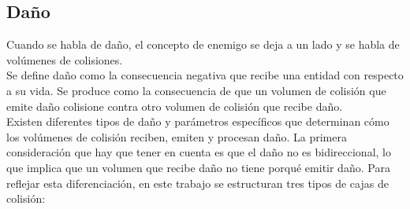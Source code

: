 \subsection{Daño}
Cuando se habla de daño, el concepto de enemigo se deja a un lado y se habla de volúmenes de colisiones.\\
Se define daño como la consecuencia negativa que recibe una entidad con respecto a su vida. Se produce como la consecuencia de que un volumen de colisión que emite daño colisione contra otro volumen de colisión que recibe daño.\\
Existen diferentes tipos de daño y parámetros específicos que determinan cómo los volúmenes de colisión reciben, emiten y procesan daño.
La primera consideración que hay que tener en cuenta es que el daño no es bidireccional, lo que implica que un volumen que recibe daño no tiene porqué emitir daño. Para reflejar esta diferenciación, en este trabajo se estructuran tres tipos de cajas de colisión:

